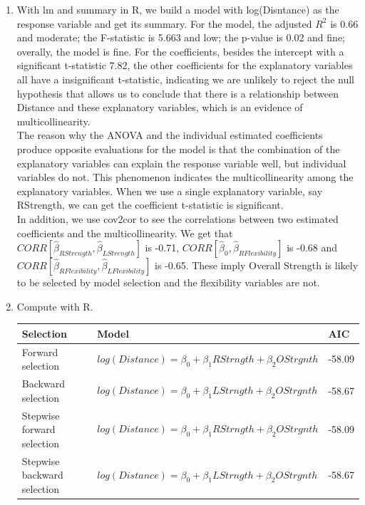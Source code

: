 \documentclass[10pt]{article}
\begin{document}
\begin{enumerate}[1)]
\item
With {\ttfamily lm} and {\ttfamily summary} in R, we build a model with {\ttfamily log(Disntance)} as the response variable and get its summary. For the model, the adjusted $R^2$ is 0.66 and moderate; the F-statistic is 5.663 and low; the p-value is 0.02 and fine; overally, the model is fine. For the coefficients, besides the intercept with a significant t-statistic 7.82, the other coefficients for the explanatory variables all have a insignificant t-statistic, indicating we are unlikely to reject the null hypothesis that allows us to conclude that there is a relationship between {\ttfamily Distance} and these explanatory variables, which is an evidence of multicollinearity.\\
The reason why the ANOVA and the individual estimated coefficients produce opposite evaluations for the model is that the combination of the explanatory variables can explain the response variable well, but individual variables do not. This phenomenon indicates the multicollinearity among the explanatory variables. When we use a single explanatory variable, say {\ttfamily RStrength}, we can get the coefficient t-statistic is significant.\\
In addition, we use {\ttfamily cov2cor} to see the correlations between two estimated coefficients and the multicollinearity. We get that $CORR[\hat{\beta}_{RStrength},\hat{\beta}_{LStrength}]$ is -0.71, $CORR[\hat{\beta}_0,\hat{\beta}_{RFlexibility}]$ is -0.68 and $CORR[\hat{\beta}_{RFlexibility},\hat{\beta}_{LFlexibility}]$ is -0.65. These imply {\ttfamily Overall Strength} is likely to be selected by model selection and the flexibility variables are not.\\

\item
Compute with R.
\begin{table}[H]
\centering
\scriptsize
\begin{tabular}{l|l|l}
Selection & Model & AIC \\ \hline
Forward selection & $log(Distance)=\beta_0+\beta_1 RStrngth+\beta_2 OStrgnth$ & -58.09\\
Backward selection & $log(Distance)=\beta_0+\beta_1 LStrngth+\beta_2 OStrgnth$ & -58.67\\
Stepwise forward selection & $log(Distance)=\beta_0+\beta_1 RStrngth+\beta_2 OStrgnth$ & -58.09\\
Stepwise backward selection & $log(Distance)=\beta_0+\beta_1 LStrngth+\beta_2 OStrgnth$ & -58.67\\
\end{tabular}
\end{table}


\end{enumerate}
\end{document}
